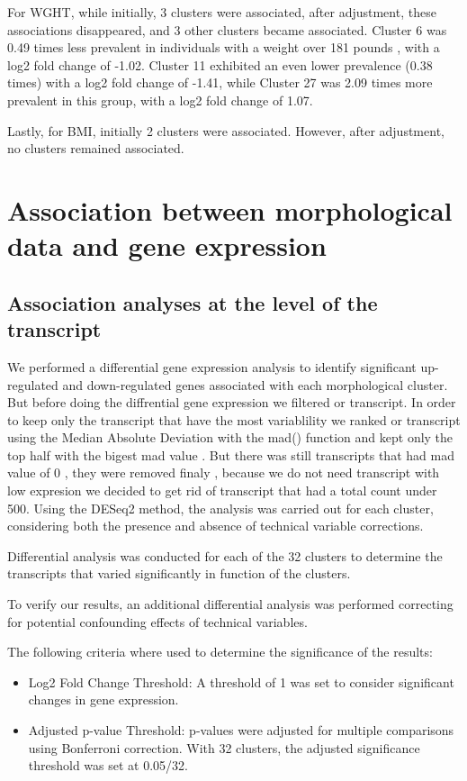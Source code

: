 \documentclass[a4paper, 11pt]{article}
\begin{document}
\begin{multicols}{2}
For WGHT, while initially, 3 clusters were associated, after adjustment, these associations disappeared, and 3 other clusters became associated. Cluster 6 was 0.49 times less prevalent in individuals with a weight over 181 pounds , with a log2 fold change of -1.02. Cluster 11 exhibited an even lower prevalence (0.38 times) with a log2 fold change of -1.41, while Cluster 27 was 2.09 times more prevalent in this group, with a log2 fold change of 1.07.

Lastly, for BMI, initially 2 clusters were associated. However, after adjustment, no clusters remained associated. 



\section{Association between morphological data and gene expression}
\subsection{Association analyses at the level of the transcript}
We performed a differential gene expression analysis to identify significant up-regulated and down-regulated genes associated with each morphological cluster.
But before doing the diffrential gene expression we filtered or transcript. In order to keep only the transcript that have the most variablility we ranked or transcript using the Median Absolute Deviation with the mad() function and kept only the top half with the bigest mad value . But there was still transcripts that had  mad value of 0 , they were removed finaly , because we do not need transcript with low expresion we decided to get rid of transcript that had a total count under 500. 
 Using the DESeq2 method, the analysis was carried out for each cluster, considering both the presence and absence of technical variable corrections. 

Differential analysis was conducted for each of the 32 clusters to determine the transcripts that varied significantly in function of the clusters.


To verify our results, an additional differential analysis was performed correcting for potential confounding effects of technical variables.

The following criteria where used to determine the significance of the results:
\begin{itemize}
    \item Log2 Fold Change Threshold: A threshold of 1 was set to consider significant changes in gene expression.
    \item Adjusted p-value Threshold: p-values were adjusted for multiple comparisons using Bonferroni correction. With 32 clusters, the adjusted significance threshold was set at 0.05/32.
\end{itemize}


\end{multicols}
\end{document}
